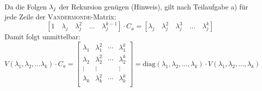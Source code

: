 \begin{flushenum}
\item
	Da die Folgen ${\bf \lambda}_j$ der Rekursion genügen (Hinweis), gilt nach Teilaufgabe a) für jede Zeile der \textsc{Vandermonde}-Matrix:
	\[ \left[ 1 \quad \lambda_j \quad \lambda_j^2 \quad \ldots \quad \lambda_j^{k-1} \right] \cdot C_a =
	   \left[ \lambda_j \quad \lambda_j^2 \quad \lambda_j^3 \quad \ldots \quad \lambda_j^k\right] \]
	Damit folgt unmittelbar:
	\[ V(\lambda_1, \lambda_2, \ldots \lambda_k) \cdot C_a = 
		\begin{bmatrix}
			\lambda_1 & \lambda_1^2 & \cdots & \lambda_1^k \\
			\lambda_2 & \lambda_2^2 & \cdots & \lambda_2^k \\
			\vdots    & \vdots      &        & \vdots      \\
			\lambda_k & \lambda_k^2 & \cdots & \lambda_k^k \\
		\end{bmatrix} = \text{diag}(\lambda_1, \lambda_2, \ldots, \lambda_k) \cdot V(\lambda_1, \lambda_2, ..., \lambda_k) \]
\end{flushenum}
